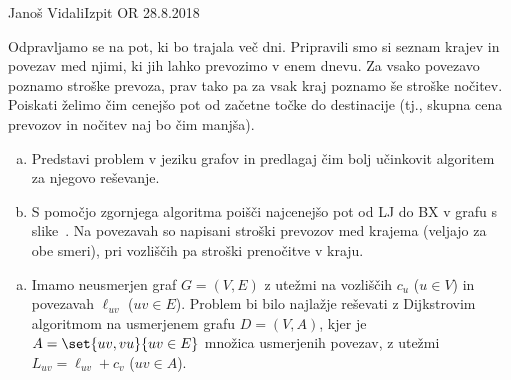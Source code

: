 \begin{naloga}{Janoš Vidali}{Izpit OR 28.8.2018}
\begin{vprasanje}
Odpravljamo se na pot, ki bo trajala več dni.
Pripravili smo si seznam krajev in povezav med njimi,
ki jih lahko prevozimo v enem dnevu.
Za vsako povezavo poznamo stroške prevoza,
prav tako pa za vsak kraj poznamo še stroške nočitev.
Poiskati želimo čim cenejšo pot od začetne točke do destinacije
(tj., skupna cena prevozov in nočitev naj bo čim manjša).

\begin{enumerate}[(a)]
\item Predstavi problem v jeziku grafov
in predlagaj čim bolj učinkovit algoritem za njegovo reševanje.

\item S pomočjo zgornjega algoritma poišči najcenejšo pot od LJ do BX
v grafu s slike~\fig[pocitnice].
Na povezavah so napisani stroški prevozov med krajema
(veljajo za obe smeri),
pri vozliščih pa stroški prenočitve v kraju.
\end{enumerate}
\end{vprasanje}

\begin{odgovor}
\begin{enumerate}[(a)]
\item Imamo neusmerjen graf $G = (V, E)$
z utežmi na vozliščih $c_u$ ($u \in V$) in povezavah $\ell_{uv}$ ($uv \in E$).
Problem bi bilo najlažje reševati z Dijkstrovim algoritmom
na usmerjenem grafu $D = (V, A)$,
kjer je $A = \set{uv, vu}{uv \in E}$ množica usme\-rje\-nih povezav,
z utežmi $L_{uv} = \ell_{uv} + c_v$ ($uv \in A$).


\end{enumerate}
\end{odgovor}
\end{naloga}
